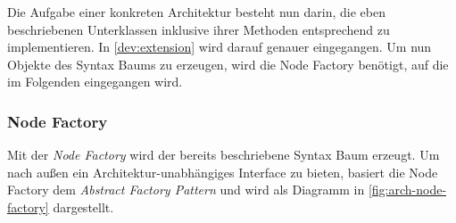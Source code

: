 Die Aufgabe einer konkreten Architektur besteht nun darin, die eben beschriebenen
Unterklassen inklusive ihrer Methoden entsprechend zu implementieren. In
\autoref{dev:extension} wird darauf genauer eingegangen.
Um nun Objekte des Syntax Baums zu erzeugen, wird die Node Factory benötigt, auf
die im Folgenden eingegangen wird.

\subsubsection{Node Factory}
\label{module-arch-node-factory}

Mit der \emph{Node Factory} wird der bereits beschriebene Syntax Baum erzeugt.
Um nach außen ein Architektur-unabhängiges Interface zu bieten, basiert die
Node Factory dem \emph{Abstract Factory Pattern} und wird als Diagramm in
\autoref{fig:arch-node-factory} dargestellt.

